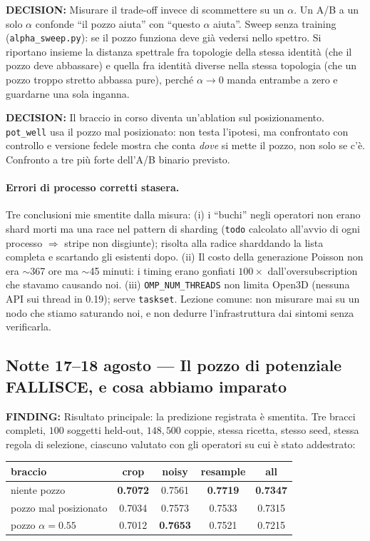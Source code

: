 \documentclass[11pt,a4paper]{article}
\newcommand{\finding}[1]{\textcolor{finding}{\textbf{FINDING:}} #1}
\newcommand{\decision}[1]{\textcolor{decision}{\textbf{DECISION:}} #1}
\begin{document}
\decision{Misurare il trade-off invece di scommettere su un $\alpha$.} Un A/B a un solo
$\alpha$ confonde ``il pozzo aiuta'' con ``questo $\alpha$ aiuta''. Sweep senza training
(\texttt{alpha\_sweep.py}): se il pozzo funziona deve già vedersi nello spettro. Si riportano
insieme la distanza spettrale fra topologie della stessa identità (che il pozzo deve
abbassare) e quella fra identità diverse nella stessa topologia (che un pozzo troppo stretto
abbassa pure), perché $\alpha \to 0$ manda entrambe a zero e guardarne una sola inganna.

\decision{Il braccio in corso diventa un'ablation sul posizionamento.} \texttt{pot\_well} usa
il pozzo mal posizionato: non testa l'ipotesi, ma confrontato con controllo e versione fedele
mostra che conta \emph{dove} si mette il pozzo, non solo se c'è. Confronto a tre più forte
dell'A/B binario previsto.

\paragraph{Errori di processo corretti stasera.} Tre conclusioni mie smentite dalla misura:
(i) i ``buchi'' negli operatori non erano shard morti ma una race nel pattern di sharding
(\texttt{todo} calcolato all'avvio di ogni processo $\Rightarrow$ stripe non disgiunte);
risolta alla radice sharddando la lista completa e scartando gli esistenti dopo. (ii) Il costo
della generazione Poisson non era $\sim$367 ore ma $\sim$45 minuti: i timing erano gonfiati
$100\times$ dall'oversubscription che stavamo causando noi. (iii) \texttt{OMP\_NUM\_THREADS}
non limita Open3D (nessuna API sui thread in 0.19); serve \texttt{taskset}. Lezione comune:
non misurare mai su un nodo che stiamo saturando noi, e non dedurre l'infrastruttura dai
sintomi senza verificarla.



\subsection{Notte 17--18 agosto --- Il pozzo di potenziale FALLISCE, e cosa abbiamo imparato}

\finding{Risultato principale: la predizione registrata è smentita.} Tre bracci completi,
$100$ soggetti held-out, $148{,}500$ coppie, stessa ricetta, stesso seed, stessa regola di
selezione, ciascuno valutato con gli operatori su cui è stato addestrato:

\begin{center}
\begin{tabular}{lcccc}
\toprule
braccio & crop & noisy & resample & all \\
\midrule
niente pozzo            & \textbf{0.7072} & 0.7561 & \textbf{0.7719} & \textbf{0.7347} \\
pozzo mal posizionato   & 0.7034 & 0.7573 & 0.7533 & 0.7315 \\
pozzo $\alpha=0.55$     & 0.7012 & \textbf{0.7653} & 0.7521 & 0.7215 \\
\bottomrule
\end{tabular}
\end{center}
\end{document}
